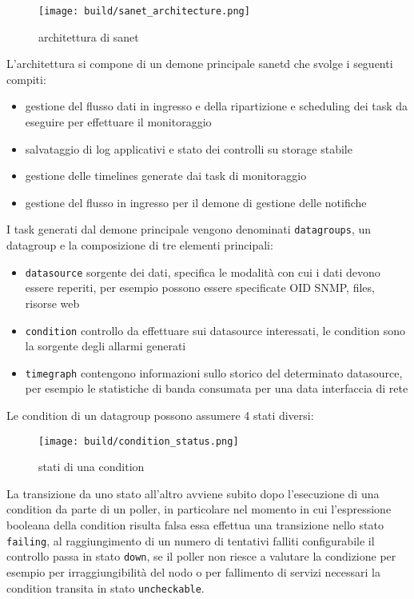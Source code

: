 \begin{figure}[H]
    \centering
    \texttt{[image: build/sanet\_architecture.png]}
    \caption{architettura di sanet}
    \label{fig:enter-label}
\end{figure}

L'architettura si compone di un demone principale sanetd che svolge i seguenti compiti:

\begin{itemize}
  \item gestione del flusso dati in ingresso e della ripartizione e scheduling dei task da eseguire per effettuare il monitoraggio
  \item salvataggio di log applicativi e stato dei controlli su storage stabile
  \item gestione delle timelines generate dai task di monitoraggio
  \item gestione del flusso in ingresso per il demone di gestione delle notifiche
\end{itemize}

I task generati dal demone principale vengono denominati \verb|datagroups|, un datagroup e la composizione di tre elementi principali:

\begin{itemize}
  \item \verb|datasource| sorgente dei dati, specifica le modalità con cui i dati devono essere reperiti, per esempio possono essere specificate OID SNMP, files, risorse web
  \item \verb|condition| controllo da effettuare sui datasource interessati, le condition sono la sorgente degli allarmi generati
  \item \verb|timegraph| contengono informazioni sullo storico del determinato datasource, per esempio le statistiche di banda consumata per una data interfaccia di rete
\end{itemize}

Le condition di un datagroup possono assumere 4 stati diversi:

\begin{figure}[H]
    \centering
    \texttt{[image: build/condition\_status.png]}
    \caption{stati di una condition}
    \label{fig:enter-label}
\end{figure}

La transizione da uno stato all'altro avviene subito dopo l'esecuzione di una condition da parte di un poller, in particolare nel momento in cui l'espressione booleana della condition risulta falsa essa effettua una transizione nello stato \verb|failing|, al raggiungimento di un numero di tentativi falliti configurabile il controllo passa in stato \verb|down|, se il poller non riesce a valutare la condizione per esempio per irraggiungibilità del nodo o per fallimento di servizi necessari la condition transita in stato \verb|uncheckable|.

